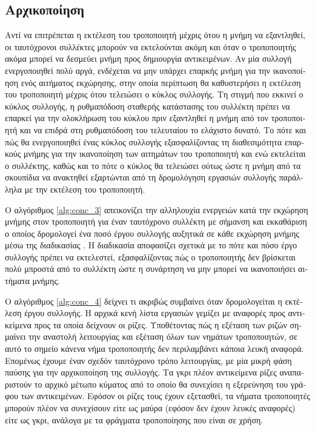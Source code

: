 \begin{greek}
\subsection{Αρχικοποίηση}
Αντί να επιτρέπεται η εκτέλεση του τροποποιητή μέχρις ότου η μνήμη να εξαντληθεί, οι ταυτόχρονοι 
συλλέκτες μπορούν να εκτελούνται ακόμη και όταν ο τροποποιητής ακόμα μπορεί να δεσμεύει μνήμη 
προς δημιουργία αντικειμένων. Αν μία συλλογή  ενεργοποιηθεί πολύ αργά, ενδέχεται να μην υπάρχει 
επαρκής μνήμη για την ικανοποίηση ενός αιτήματος εκχώρησης, στην οποία περίπτωση θα καθυστερήσει 
η εκτέλεση του τροποποιητή μέχρις ότου τελειώσει ο κύκλος συλλογής. Τη στιγμή που εκκινεί ο 
κύκλος συλλογής, η ρυθμαπόδοση σταθερής κατάστασης του συλλέκτη πρέπει να επαρκεί για την 
ολοκλήρωση του κύκλου πριν εξαντληθεί η μνήμη από τον τροποποιητή και να επιδρά στη ρυθμαπόδοση 
του τελευταίου το ελάχιστο δυνατό. Το πότε και πώς θα ενεργοποιηθεί ένας κύκλος συλλογής 
εξασφαλίζοντας τη διαθεσιμότητα επαρκούς μνήμης για την ικανοποίηση των αιτημάτων του τροποποιητή 
και ενώ εκτελείται ο συλλέκτης, καθώς και το πότε ο κύκλος θα τελειώσει ούτως ώστε η μνήμη από
τα σκουπίδια να ανακτηθεί εξαρτώνται από τη δρομολόγηση εργασιών συλλογής παράλληλα με την 
εκτέλεση του τροποποιητή.

Ο αλγόριθμος \ref{alg:conc_3} απεικονίζει την αλληλουχία ενεργειών κατά την εκχώρηση μνήμης στον 
τροποποιητή για έναν ταυτόχρονο συλλέκτη με σήμανση και εκκαθάριση ο οποίος δρομολογεί ένα 
ποσό έργου συλλογής αυξητικά σε κάθε εκχώρηση μνήμης μέσω της διαδικασίας . 
Η διαδικασία  αποφασίζει σχετικά με το πότε και πόσο έργο συλλογής πρέπει να 
εκτελεστεί, εξασφαλίζοντας πώς ο τροποποιητής δεν βρίσκεται πολύ μπροστά από το συλλέκτη ώστε η 
συνάρτηση  να μην μπορεί να ικανοποιήσει αιτήματα μνήμης.

Ο αλγόριθμος \ref{alg:conc_4} δείχνει τι ακριβώς συμβαίνει όταν δρομολογείται η εκτέλεση έργου 
συλλογής. Η αρχικά κενή λίστα εργασιών γεμίζει με αναφορές προς αντικείμενα προς τα οποία δείχνουν 
οι ρίζες. Υποθέτοντας πώς η εξέταση των ριζών σημαίνει την αναστολή λειτουργίας και εξέταση όλων 
των νημάτων τροποποιητών, σε αυτό το σημείο κάνενα νήμα τροποποιητής δεν περιλαμβάνει κάποια 
λευκή αναφορά. Επομένως έχουμε έναν σχεδόν ταυτόχρονο τρόπο λειτουργίας, με μία μικρή φάση παύσης 
για την αρχικοποίηση της συλλογής. Τα γκρι πλέον αντικείμενα ρίζες αναπαριστούν το αρχικό μέτωπο 
κύματος από το οποίο θα συνεχίσει η εξερεύνηση του γράφου των αντικειμένων. Εφόσον οι ρίζες τους
έχουν εξετασθεί, τα νήματα τροποποιητές μπορούν πλέον να συνεχίσουν είτε ως μαύρα (εφόσον δεν 
έχουν λευκές αναφορές) είτε ως γκρι, ανάλογα με τα φράγματα τροποποίησης που είναι σε χρήση.


\end{greek}
